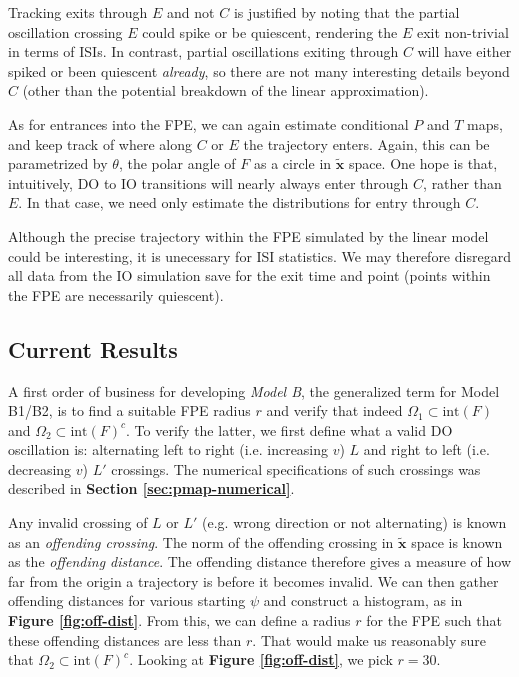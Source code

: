 \documentclass[letterpaper,12pt]{article}
\numberwithin{table}{section}
\numberwithin{figure}{section}
\numberwithin{equation}{section}
\newcommand{\reffig}[1]{\textbf{Figure \ref{#1}}}
\newcommand{\refsec}[1]{\textbf{Section \ref{#1}}}
\begin{document}
\begin{flushleft}
    Tracking exits through $E$ and not $C$ is justified by noting that the partial oscillation crossing $E$ could spike or be quiescent, rendering the $E$ exit non-trivial in terms of ISIs. In contrast, partial oscillations exiting through $C$ will have either spiked or been quiescent \textit{already}, so there are not many interesting details beyond $C$ (other than the potential breakdown of the linear approximation).

    As for entrances into the FPE, we can again estimate conditional $P$ and $T$ maps, and keep track of where along $C$ or $E$ the trajectory enters. Again, this can be parametrized by $\theta$, the polar angle of $F$ as a circle in $\tilde{\mathbf{x}}$ space. One hope is that, intuitively, DO to IO transitions will nearly always enter through $C$, rather than $E$. In that case, we need only estimate the distributions for entry through $C$.

    Although the precise trajectory within the FPE simulated by the linear model could be interesting, it is unecessary for ISI statistics. We may therefore disregard all data from the IO simulation save for the exit time and point (points within the FPE are necessarily quiescent).

    \subsection{Current Results}

    A first order of business for developing \textit{Model B}, the generalized term for Model B1/B2, is to find a suitable FPE radius $r$ and verify that indeed $\Omega_1 \subset \text{int}(F)$ and $\Omega_2 \subset \text{int}(F)^c$. To verify the latter, we first define what a valid DO oscillation is: alternating left to right (i.e. increasing $v$) $L$ and right to left (i.e. decreasing $v$) $L'$ crossings. The numerical specifications of such crossings was described in \refsec{sec:pmap-numerical}.

    Any invalid crossing of $L$ or $L'$ (e.g. wrong direction or not alternating) is known as an \textit{offending crossing}. The norm of the offending crossing in $\tilde{\mathbf{x}}$ space is known as the \textit{offending distance}. The offending distance therefore gives a measure of how far from the origin a trajectory is before it becomes invalid. We can then gather offending distances for various starting $\psi$ and construct a histogram, as in \reffig{fig:off-dist}. From this, we can define a radius $r$ for the FPE such that these offending distances are less than $r$. That would make us reasonably sure that $\Omega_2 \subset \text{int}(F)^c$. Looking at \reffig{fig:off-dist}, we pick $r = 30$.


\end{flushleft}
\end{document}
